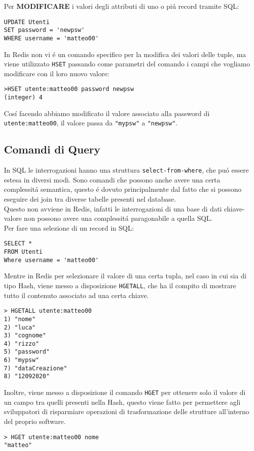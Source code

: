Per \textbf{MODIFICARE} i valori degli attributi di uno o piú record tramite SQL:
\begin{lstlisting}[autogobble]
UPDATE Utenti
SET password = 'newpsw'
WHERE username = 'matteo00'\end{lstlisting}

In Redis non vi é un comando specifico per la modifica dei valori delle tuple, ma viene utilizzato \texttt{HSET} passando come parametri del comando
i campi che vogliamo modificare con il loro nuovo valore:
\begin{lstlisting}[autogobble]
>HSET utente:matteo00 password newpsw
(integer) 4\end{lstlisting}
Cosí facendo abbiamo modificato il valore associato alla password di \texttt{utente:matteo00}, il valore passa da \texttt{"mypsw"} a \texttt{"newpsw"}.

\subsection{Comandi di Query}
In SQL le interrogazioni hanno una struttura \texttt{select-from-where}, che puó essere estesa in diversi modi. Sono comandi
che possono anche avere una certa complessitá semantica, questo é dovuto principalmente dal fatto che si possono eseguire dei join
tra diverse tabelle presenti nel database.\\
Questo non avviene in Redis, infatti le interrogazioni di una base di dati chiave-valore non possono avere una complessitá paragonabile a quella SQL.\\

Per fare una selezione di un record in SQL:
\begin{lstlisting}[autogobble]
SELECT *
FROM Utenti
Where username = 'matteo00'\end{lstlisting}

Mentre in Redis per selezionare il valore di una certa tupla, nel caso in cui sia di tipo Hash, viene messo a disposizione \texttt{HGETALL}, che ha il compito di mostrare tutto
il contenuto associato ad una certa chiave.
\begin{lstlisting}[autogobble]
> HGETALL utente:matteo00
1) "nome"
2) "luca"
3) "cognome"
4) "rizzo"
5) "password"
6) "mypsw"
7) "dataCreazione"
8) "12092020"
\end{lstlisting}

Inoltre, viene messo a disposizione il comando \texttt{HGET} per ottenere solo il valore di un campo tra quelli presenti nella Hash, questo viene fatto per permettere
agli sviluppatori di risparmiare operazioni di trasformazione delle strutture all'interno del proprio software.
\begin{lstlisting}[autogobble]
> HGET utente:matteo00 nome
"matteo"
\end{lstlisting}

